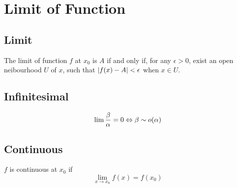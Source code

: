 \section{Limit of Function}

\subsection{Limit}
The limit of function $f$ at $x_0$ is $A$ if and only if,
for any $\epsilon > 0$, exist an open neibourhood $U$ of $x$,
such that $\left| {f(x) - A} \right| < \epsilon$ when $x \in U$.

\subsection{Infinitesimal}
$$\lim {\beta \over \alpha} = 0 \Leftrightarrow \beta \sim o(\alpha)$$


\subsection{Continuous}
$f$ is continuous at $x_0$ if $$\lim_{x \to x_0} f(x) = f(x_0)$$
